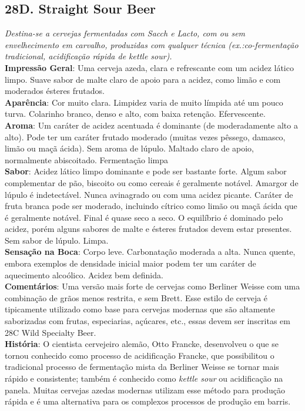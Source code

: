 \subsection*{28D. Straight Sour Beer}
\textit{Destina-se a cervejas fermentadas com Sacch e Lacto, com ou sem envelhecimento em carvalho, produzidas com qualquer técnica (ex.:co-fermentação tradicional, acidificação rápida de kettle sour).}\\
\textbf{Impressão Geral}: Uma cerveja azeda, clara e refrescante com um acidez lático limpo. Suave sabor de malte claro de apoio para a acidez, como limão e com moderados ésteres frutados. \\
\textbf{Aparência}: Cor muito clara. Limpidez varia de muito límpida até um pouco turva. Colarinho branco, denso e alto, com baixa retenção. Efervescente. \\
\textbf{Aroma}: Um caráter de acidez acentuada é dominante (de moderadamente alto a alto). Pode ter um caráter frutado moderado (muitas vezes pêssego, damasco, limão ou maçã ácida). Sem aroma de lúpulo. Maltado claro de apoio, normalmente abiscoitado. Fermentação limpa \\
\textbf{Sabor}: Acidez lático limpo dominante e pode ser bastante forte. Algum sabor complementar de pão, biscoito ou como cereais é geralmente notável. Amargor de lúpulo é indetectável. Nunca avinagrado ou com uma acidez picante. Caráter de fruta branca pode ser moderado, incluindo cítrico como limão ou maçã ácida que é geralmente notável. Final é quase seco a seco. O equilíbrio é dominado pelo acidez, porém alguns sabores de malte e ésteres frutados devem estar presentes. Sem sabor de lúpulo. Limpa. \\
\textbf{Sensação na Boca}: Corpo leve. Carbonatação moderada a alta. Nunca quente, embora exemplos de densidade inicial maior podem ter um caráter de aquecimento alcoólico. Acidez bem definida. \\
\textbf{Comentários}: Uma versão mais forte de cervejas como Berliner Weisse com uma combinação de grãos menos restrita, e sem Brett. Esse estilo de cerveja é tipicamente utilizado como base para cervejas modernas que são altamente saborizadas com frutas, especiarias, açúcares, etc., essas devem ser inscritas em 28C Wild Specialty Beer. \\
\textbf{História}: O cientista cervejeiro alemão, Otto Francke, desenvolveu o que se tornou conhecido como processo de acidificação Francke, que possibilitou o tradicional processo de fermentação mista da Berliner Weisse se tornar mais rápido e consistente; também é conhecido como \textit{kettle sour} ou acidificação na panela. Muitas cervejas azedas modernas utilizam esse método para produção rápida e é uma alternativa para os complexos processos de produção em barris. \\
